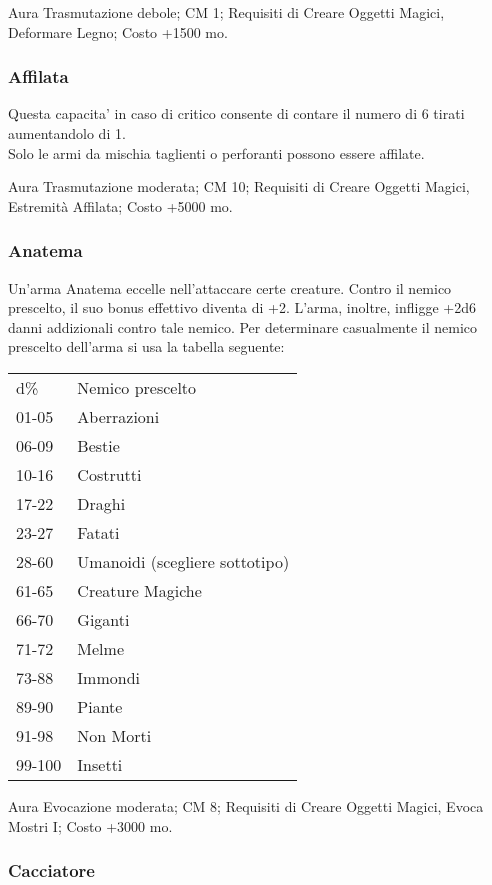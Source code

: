\begin{multicols}{2}
Aura Trasmutazione debole; CM 1; Requisiti di Creare Oggetti Magici, Deformare Legno; Costo +1500 mo.

\subsubsection{Affilata}

Questa capacita' in caso di critico consente di contare il numero di 6 tirati aumentandolo di 1.\\
Solo le armi da mischia taglienti o perforanti possono essere affilate.

Aura Trasmutazione moderata; CM 10; Requisiti di Creare Oggetti Magici, Estremità Affilata; Costo +5000 mo.

\subsubsection{Anatema}

Un'arma Anatema eccelle nell'attaccare certe creature. Contro il nemico prescelto, il suo bonus effettivo diventa di +2. L'arma, inoltre, infligge +2d6 danni addizionali contro tale nemico. Per determinare casualmente il nemico prescelto dell'arma si usa la tabella seguente:

\medskip

\begin{tabular}{ll}
d\% 	&Nemico prescelto\\
01-05 	&Aberrazioni\\
06-09 	&Bestie\\
10-16 	&Costrutti\\
17-22 	&Draghi\\
23-27 	&Fatati\\
28-60 	&Umanoidi (scegliere sottotipo)\\
61-65 	&Creature Magiche\\
66-70 	&Giganti\\
71-72 	&Melme\\
73-88 	&Immondi\\
89-90 	&Piante\\
91-98 	&Non Morti\\
99-100 	&Insetti\\
\end{tabular}

\medskip

Aura Evocazione moderata; CM 8; Requisiti di Creare Oggetti Magici, Evoca Mostri I; Costo +3000 mo.

\subsubsection{Cacciatore}


\end{multicols}
